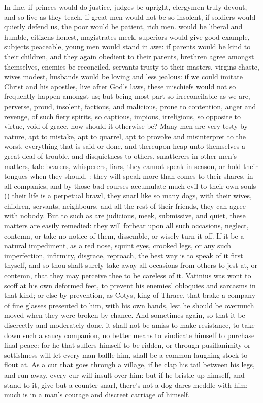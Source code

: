 {In fine, if princes would do justice, judges be upright, clergymen truly devout, and so live as they teach, if great men would not be so insolent, if soldiers would quietly defend us, the poor would be patient, rich men. would be liberal and humble, citizens honest, magistrates meek, superiors would give good example, subjects peaceable, young men would stand in awe: if parents would be kind to their children, and they again obedient to their parents, brethren agree amongst themselves, enemies be reconciled, servants trusty to their masters, virgins chaste, wives modest, husbands would be loving and less jealous: if we could imitate Christ and his apostles, live after God's laws, these mischiefs would not so frequently happen amongst us; but being most part so irreconcilable as we are, perverse, proud, insolent, factious, and malicious, prone to contention, anger and revenge, of such fiery spirits, so captious, impious, irreligious, so opposite to virtue, void of grace, how should it otherwise be? Many men are very testy by nature, apt to mistake, apt to quarrel, apt to provoke and misinterpret to the worst, everything that is said or done, and thereupon heap unto themselves a great deal of trouble, and disquietness to others, smatterers in other men's matters, tale-bearers, whisperers, liars, they cannot speak in season, or hold their tongues when they should, : they will speak more than comes to their shares, in all companies, and by those bad courses accumulate much evil to their own souls () their life is a perpetual brawl, they snarl like so many dogs, with their wives, children, servants, neighbours, and all the rest of their friends, they can agree with nobody. But to such as are judicious, meek, submissive, and quiet, these matters are easily remedied: they will forbear upon all such occasions, neglect, contemn, or take no notice of them, dissemble, or wisely turn it off. If it be a natural impediment, as a red nose, squint eyes, crooked legs, or any such imperfection, infirmity, disgrace, reproach, the best way is to speak of it first thyself, and so thou shalt surely take away all occasions from others to jest at, or contemn, that they may perceive thee to be careless of it. Vatinius was wont to scoff at his own deformed feet, to prevent his enemies' obloquies and sarcasms in that kind; or else by prevention, as Cotys, king of Thrace, that brake a company of fine glasses presented to him, with his own hands, lest he should be overmuch moved when they were broken by chance. And sometimes again, so that it be discreetly and moderately done, it shall not be amiss to make resistance, to take down such a saucy companion, no better means to vindicate himself to purchase final peace: for he that suffers himself to be ridden, or through pusillanimity or sottishness will let every man baffle him, shall be a common laughing stock to flout at. As a cur that goes through a village, if he clap his tail between his legs, and run away, every cur will insult over him: but if he bristle up himself, and stand to it, give but a counter-snarl, there's not a dog dares meddle with him: much is in a man's courage and discreet carriage of himself.

}
